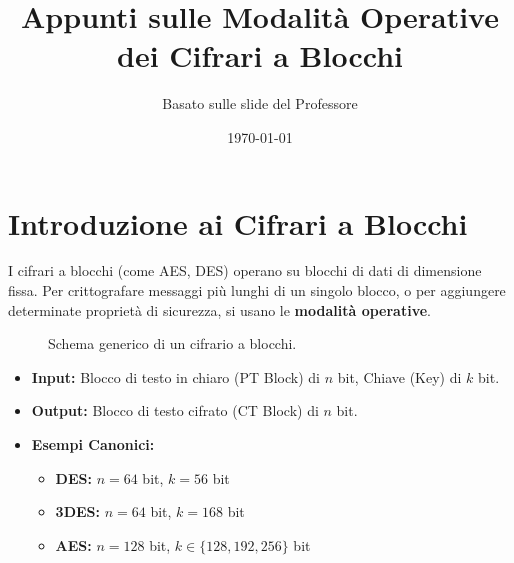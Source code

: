 \documentclass{article}
\title{Appunti sulle Modalità Operative dei Cifrari a Blocchi}
\author{Basato sulle slide del Professore}
\date{\today}
\begin{document}
\maketitle
\tableofcontents
\newpage

\section{Introduzione ai Cifrari a Blocchi}
I cifrari a blocchi (come AES, DES) operano su blocchi di dati di dimensione fissa. Per crittografare messaggi più lunghi di un singolo blocco, o per aggiungere determinate proprietà di sicurezza, si usano le \textbf{modalità operative}.

\begin{figure}[H]
    \centering
    \caption{Schema generico di un cifrario a blocchi.}
    \label{fig:block_cipher_generic}
\end{figure}

\begin{itemize}
    \item \textbf{Input:} Blocco di testo in chiaro (PT Block) di $n$ bit, Chiave (Key) di $k$ bit.
    \item \textbf{Output:} Blocco di testo cifrato (CT Block) di $n$ bit.
    \item \textbf{Esempi Canonici:}
    \begin{itemize}
        \item \textbf{DES:} $n = 64$ bit, $k = 56$ bit
        \item \textbf{3DES:} $n = 64$ bit, $k = 168$ bit
        \item \textbf{AES:} $n = 128$ bit, $k \in \{128, 192, 256\}$ bit
    \end{itemize}
\end{itemize}
\end{document}
